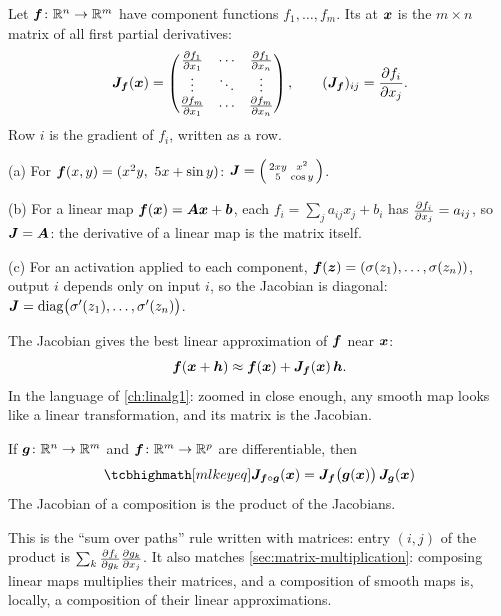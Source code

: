 \begin{definition}\label{def:jacobian}
Let $\bm{f}\colon\mathbb{R}^n\to\mathbb{R}^m$ have component functions $f_1, \dots, f_m$. Its
 at $\bm{x}$ is the $m\times n$ matrix of all first partial
derivatives:
\[
  \bm{J}_{\bm{f}}(\bm{x}) = \begin{pmatrix}
    \frac{\partial f_1}{\partial x_1} & \cdots & \frac{\partial f_1}{\partial x_n}\\
    \vdots & \ddots & \vdots\\
    \frac{\partial f_m}{\partial x_1} & \cdots & \frac{\partial f_m}{\partial x_n}
  \end{pmatrix},
  \qquad (\bm{J}_{\bm{f}})_{ij} = \frac{\partial f_i}{\partial x_j}.
\]
Row $i$ is the gradient of $f_i$, written as a row.
\end{definition}

\begin{example}[Jacobians]\label{ex:jacobians}
(a) For $\bm{f}(x, y) = (x^2y,\ 5x + \sin y)$:
$\bm{J} = \left(\begin{smallmatrix} 2xy & x^2\\ 5 & \cos y\end{smallmatrix}\right)$.

(b) For a linear map $\bm{f}(\bm{x}) = \bm{A}\bm{x} + \bm{b}$, each $f_i = \sum_j a_{ij}x_j + b_i$
has $\frac{\partial f_i}{\partial x_j} = a_{ij}$, so $\bm{J} = \bm{A}$: the derivative of a linear
map is the matrix itself.

(c) For an activation applied to each component, $\bm{f}(\bm{z}) = (\sigma(z_1),
\dots, \sigma(z_n))$, output $i$ depends only on input $i$, so the Jacobian is
diagonal: $\bm{J} = \operatorname{diag}\bigl(\sigma'(z_1), \dots, \sigma'(z_n)\bigr)$.
\end{example}

The Jacobian gives the best linear approximation of $\bm{f}$ near $\bm{x}$:
\[
  \bm{f}(\bm{x} + \bm{h}) \approx \bm{f}(\bm{x}) + \bm{J}_{\bm{f}}(\bm{x})\,\bm{h} .
\]
In the language of \cref{ch:linalg1}: zoomed in close enough, any smooth map
looks like a linear transformation, and its matrix is the Jacobian.

\begin{theorem}\label{thm:chain-matrix}
If $\bm{g}\colon\mathbb{R}^n\to\mathbb{R}^m$ and $\bm{f}\colon\mathbb{R}^m\to\mathbb{R}^p$ are differentiable, then
\[
  \keyeq{\mat{J}_{\vf\circ\vg}(\vx) = \mat{J}_{\vf}\bigl(\vg(\vx)\bigr)\,\mat{J}_{\vg}(\vx)}
\]
The Jacobian of a composition is the product of the Jacobians.
\end{theorem}

This is the ``sum over paths'' rule written with matrices: entry $(i, j)$ of
the product is $\sum_k \frac{\partial f_i}{\partial g_k}\frac{\partial g_k}{\partial x_j}$. It also matches
\cref{sec:matrix-multiplication}: composing linear maps multiplies their
matrices, and a composition of smooth maps is, locally, a composition of their
linear approximations.

